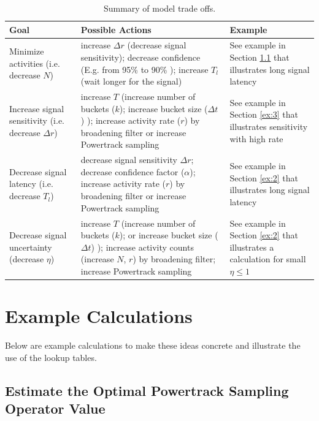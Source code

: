 \documentclass{article}
\begin{document}
\begin{table}[!h]
    \begin{tabular}{ p{3.0cm}| p{5.2cm} | p{2.6cm}}
     \hline
Goal  & Possible Actions & Example\\
\hline
Minimize activities (i.e. decrease $N$)  & increase $\Delta r$ (decrease signal sensitivity); decrease 
	confidence (E.g. from 95\% to 90\% ); increase $T_l$ (wait longer for the signal)  & See example 
	in Section \ref{ex:1} that illustrates long signal latency\\
\hline	
Increase signal sensitivity (i.e. decrease $\Delta r$) & increase $T$ (increase number of buckets ($k$); 
	increase bucket size ($\Delta t$) ); increase activity rate ($r$) by broadening filter or increase 
	Powertrack sampling  & See example in Section \ref{ex:3} that illustrates sensitivity with high rate\\
\hline
Decrease signal latency  (i.e. decrease $T_l$)   & decrease signal sensitivity $\Delta r$;
	decrease confidence factor ($\alpha$); increase activity rate ($r$) by broadening filter 
	or increase Powertrack sampling  & See example in Section \ref{ex:2} that illustrates long signal latency\\
\hline
Decrease signal uncertainty   (decrease $\eta$)  & increase $T$ (increase number of buckets ($k$); or 
	increase bucket size ($\Delta t$) ); increase activity counts (increase $N$, $r$) by broadening 
	filter; increase Powertrack sampling & See example in Section \ref{ex:2} that illustrates a calculation
	for small $\eta \le 1$\\
\hline
\end{tabular}
\caption{Summary of model trade offs.}
\label{tab:tradeoff}

\end{table}

\section{Example Calculations} 

Below are example calculations to make these ideas concrete and illustrate the use of the lookup tables.

\subsection{Estimate the Optimal Powertrack Sampling Operator Value} 
\label{ex:1}
\end{document}
